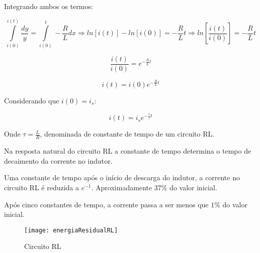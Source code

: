 \documentclass[12pt,fleqn]{book} %
\begin{document}
{Integrando ambos os termos:

\begin{equation}
\int\limits_{i(0)}^{i(t)}\frac{dy}{y} = \int\limits_{i(0)}^{t}-\frac{R}{L}dx \Rightarrow ln[i(t)]-ln[i(0)]=-\frac{R}{L} t \Rightarrow ln[\frac{i(t)}{i(0)}]= -\frac{R}{L} t
\end{equation}

\begin{equation}
\frac{i(t)}{i(0)} = e^{-\frac{R}{L} t}
\end{equation}

\begin{equation}
i(t) = i(0)e^{-\frac{R}{L} t}
\end{equation}

Considerando que $i(0) = i_s$:

\begin{equation}
i(t) = i_se^{-\frac{t}{\tau} t}
\end{equation}

Onde $\tau = \frac{L}{R}$, denominada de constante de tempo de um circuito RL.

\begin{remark}
Na resposta natural do circuito RL a constante de tempo determina o tempo de decaimento da corrente no indutor.
\end{remark}

\begin{remark}
Uma constante de tempo após o início de descarga do indutor, a corrente no circuito RL é reduzida a $e^{-1}$. Aproximadamente $37\%$ do valor inicial.
\end{remark}

\begin{remark}
Após cinco constantes de tempo, a corrente passa a ser menos que $1\%$ do valor inicial.
\end{remark}

        \begin{figure}[!htbp] \centering\texttt{[image: energiaResidualRL]}
            \caption{Circuito RL}\label{energiaResidualRL} 
        \end{figure}

}
\end{document}

